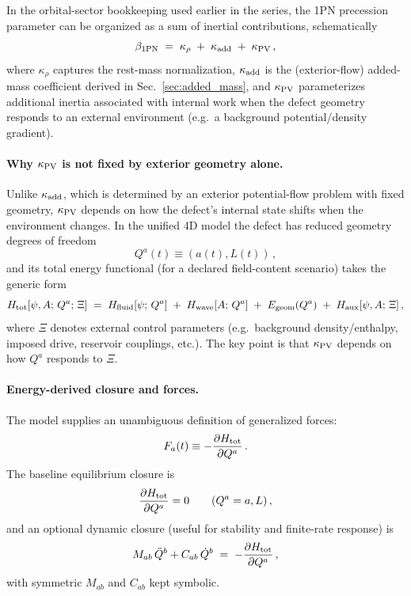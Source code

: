 \documentclass[11pt]{article}
\begin{document}
In the orbital-sector bookkeeping used earlier in the series, the 1PN precession parameter can be
organized as a sum of inertial contributions, schematically
\begin{equation}
  \beta_{\rm 1PN}
  \;=\;
  \kappa_{\rho} \;+\; \kappa_{\rm add} \;+\; \kappa_{\rm PV}\,,
  \label{eq:beta_decomp}
\end{equation}
where $\kappa_{\rho}$ captures the rest-mass normalization, $\kappa_{\rm add}$ is the (exterior-flow)
added-mass coefficient derived in Sec.~\ref{sec:added_mass}, and $\kappa_{\rm PV}$ parameterizes
additional inertia associated with internal work when the defect geometry responds to an external
environment (e.g.\ a background potential/density gradient).

\paragraph{Why \texorpdfstring{$\kappa_{\rm PV}$}{kappa\_ PV} is not fixed by exterior geometry alone.}
Unlike $\kappa_{\rm add}$, which is determined by an exterior potential-flow problem with fixed
geometry, $\kappa_{\rm PV}$ depends on how the defect's internal state shifts when the environment
changes. In the unified 4D model the defect has reduced geometry degrees of freedom
\begin{equation}
  Q^a(t)\equiv (a(t),L(t))\,,
\end{equation}
and its total energy functional (for a declared field-content scenario) takes the generic form
\begin{equation}
  H_{\rm tot}[\psi,A;\,Q^a;\,\Xi]
  \;=\;
  H_{\rm fluid}[\psi;\,Q^a]
  \;+\;
  H_{\rm wave}[A;\,Q^a]
  \;+\;
  E_{\rm geom}(Q^a)
  \;+\;
  H_{\rm aux}[\psi,A;\,\Xi]\,,
  \label{eq:Htot_generic}
\end{equation}
where $\Xi$ denotes external control parameters (e.g.\ background density/enthalpy, imposed drive,
reservoir couplings, etc.). The key point is that $\kappa_{\rm PV}$ depends on how $Q^a$ responds to $\Xi$.

\paragraph{Energy-derived closure and forces.}
The model supplies an unambiguous definition of generalized forces:
\begin{equation}
  F_a(t)\equiv -\frac{\partial H_{\rm tot}}{\partial Q^a}\,.
  \label{eq:Fa_def}
\end{equation}
The baseline equilibrium closure is
\begin{equation}
  \frac{\partial H_{\rm tot}}{\partial Q^a}=0
  \qquad (Q^a=a,L)\,,
  \label{eq:equilibrium_closure}
\end{equation}
and an optional dynamic closure (useful for stability and finite-rate response) is
\begin{equation}
  M_{ab}\,\ddot Q^b + C_{ab}\,\dot Q^b
  \;=\;
  -\frac{\partial H_{\rm tot}}{\partial Q^a}\,,
  \label{eq:dynamic_wall_law}
\end{equation}
with symmetric $M_{ab}$ and $C_{ab}$ kept symbolic.
\end{document}
